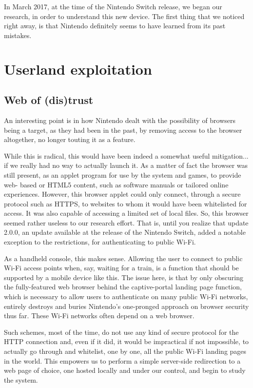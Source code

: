 \documentclass[journal]{IEEEtran}
\begin{document}
In March 2017, at the time of the Nintendo Switch release, we began our research,
in order to understand this new device. The first thing that we noticed right away,
is that Nintendo definitely seems to have learned from its past mistakes.


\section{Userland exploitation}

\subsection{Web of (dis)trust}

An interesting point is in how Nintendo dealt with the possibility of browsers being
a target, as they had been in the past, \cite{3ds_browser} \cite{wiiu} by removing
access to the browser altogether, no longer touting it as a feature.

While this is radical, this would have been indeed a somewhat useful mitigation...
if we really had no way to actually launch it. As a matter of fact the browser was
still present, as an applet program for use by the system and games, to provide web-
based or HTML5 content, such as software manuals or tailored online experiences.
However, this browser applet could only connect, through a secure protocol such as
HTTPS, to websites to whom it would have been whitelisted for access. It was also
capable of accessing a limited set of local files. So, this browser seemed rather
useless to our research effort. That is, until you realize that update 2.0.0,
an update available at the release of the Nintendo Switch,
added a notable exception to the restrictions, for authenticating to public Wi-Fi. 

As a handheld console, this makes sense. Allowing the user to connect to public
Wi-Fi access points when, say, waiting for a train, is a function that should
be supported by a mobile device like this. The issue here, is that by only obscuring
the fully-featured web browser behind the captive-portal landing page function,
which is necessary to allow users to authenticate on many public Wi-Fi networks, 
entirely destroys and buries Nintendo's one-pronged approach on browser security
thus far. These Wi-Fi networks often depend on a web browser.

Such schemes, most of the time, do not use any kind of secure 
protocol for the HTTP connection and, even if it did, it would be impractical if not
impossible, to actually go through and whitelist, one by one, all the public Wi-Fi
landing pages in the world. This empowers us to perform a simple server-side
redirection to a web page of choice, one hosted locally and under our control,
and begin to study the system.
\end{document}
